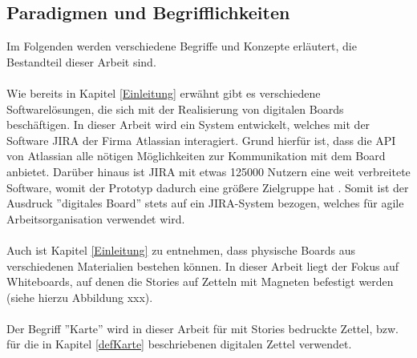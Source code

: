 \documentclass[12pt,titlepage]{scrartcl}
\begin{document}
		\subsection{Paradigmen und Begrifflichkeiten}
		Im Folgenden werden verschiedene Begriffe und Konzepte erläutert, die Bestandteil dieser Arbeit sind. \\ \\
		Wie bereits in Kapitel \ref{Einleitung} erwähnt gibt es verschiedene Softwarelösungen, die sich mit der Realisierung von digitalen Boards beschäftigen. In dieser Arbeit wird ein System entwickelt, welches mit der Software JIRA der Firma Atlassian interagiert. Grund hierfür ist, dass die API von Atlassian alle nötigen Möglichkeiten zur Kommunikation mit dem Board anbietet. Darüber hinaus ist JIRA mit etwas 125000 Nutzern eine weit verbreitete Software, womit der Prototyp dadurch eine größere Zielgruppe hat \cite{jirarevenue}. Somit ist der Ausdruck ''digitales Board'' stets auf ein JIRA-System bezogen, welches für agile Arbeitsorganisation verwendet wird. \\ \\
		Auch ist Kapitel \ref{Einleitung} zu entnehmen, dass physische Boards aus verschiedenen Materialien bestehen können. In dieser Arbeit liegt der Fokus auf Whiteboards, auf denen die Stories auf Zetteln mit Magneten befestigt werden (siehe hierzu Abbildung xxx). \\ \\
		Der Begriff ''Karte'' wird in dieser Arbeit für mit Stories bedruckte Zettel, bzw. für die in Kapitel \ref{defKarte} beschriebenen digitalen Zettel verwendet. 
\end{document}
